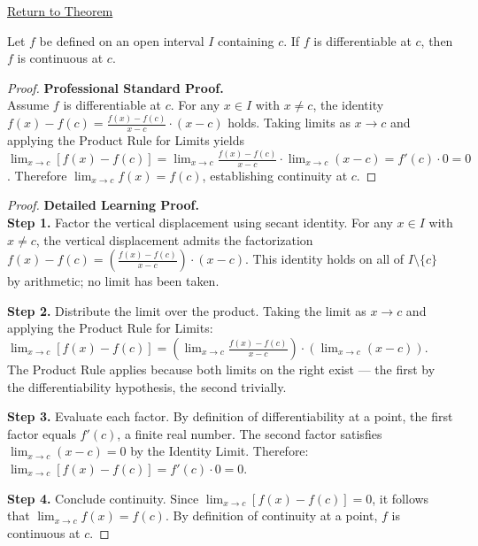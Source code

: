 \newpage
{}
\label{prf:differentiable-implies-continuous}

\begin{remark*}[Return]
\hyperref[thm:differentiable-implies-continuous]{Return to Theorem}
\end{remark*}

\begin{theorem*}
Let $f$ be defined on an open interval $I$ containing $c$. If $f$ is differentiable at $c$, then $f$ is continuous at $c$.
\end{theorem*}

\begin{proof}
\textbf{Professional Standard Proof.}~\\
Assume $f$ is differentiable at $c$. For any $x \in I$ with $x \neq c$, the identity $f(x) - f(c) = \frac{f(x) - f(c)}{x - c} \cdot (x - c)$ holds. Taking limits as $x \to c$ and applying the Product Rule for Limits yields $\lim_{x \to c}[f(x) - f(c)] = \lim_{x \to c}\frac{f(x) - f(c)}{x - c} \cdot \lim_{x \to c}(x - c) = f'(c) \cdot 0 = 0$. Therefore $\lim_{x \to c} f(x) = f(c)$, establishing continuity at $c$.
\end{proof}

\begin{proof}
\textbf{Detailed Learning Proof.}~\\

\textbf{Step 1.} Factor the vertical displacement using secant identity. For any $x \in I$ with $x \neq c$, the vertical displacement admits the factorization $f(x) - f(c) = \left(\frac{f(x) - f(c)}{x - c}\right) \cdot (x - c)$. This identity holds on all of $I \setminus \{c\}$ by arithmetic; no limit has been taken.

\textbf{Step 2.} Distribute the limit over the product. Taking the limit as $x \to c$ and applying the Product Rule for Limits: $\lim_{x \to c} [f(x) - f(c)] = \left(\lim_{x \to c} \frac{f(x) - f(c)}{x - c}\right) \cdot \left(\lim_{x \to c} (x - c)\right)$. The Product Rule applies because both limits on the right exist --- the first by the differentiability hypothesis, the second trivially.

\textbf{Step 3.} Evaluate each factor. By definition of differentiability at a point, the first factor equals $f'(c)$, a finite real number. The second factor satisfies $\lim_{x \to c}(x - c) = 0$ by the Identity Limit. Therefore: $\lim_{x \to c} [f(x) - f(c)] = f'(c) \cdot 0 = 0$.

\textbf{Step 4.} Conclude continuity. Since $\lim_{x \to c}[f(x) - f(c)] = 0$, it follows that $\lim_{x \to c} f(x) = f(c)$. By definition of continuity at a point, $f$ is continuous at $c$.
\end{proof}


